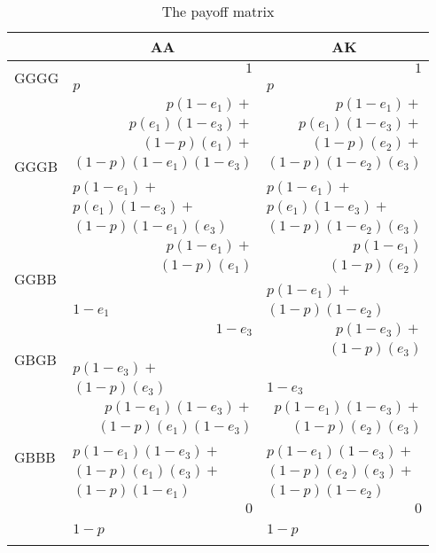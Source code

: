 \documentclass[a4paper,12pt]{article}
\numberwithin{equation}{section}
\renewcommand*{\arraystretch}{1.4}
\begin{document}
\begin{table}[h!]
\renewcommand\arraystretch{1.15}
\begin{center}
\begin{tabular}{l||l|l}
 &\multicolumn{1}{c|}{AA}&\multicolumn{1}{c}{AK}\\
\hline
\hline
\multirow{3}{*}{GGGG}&\multicolumn{1}{r|}{$1$}&\multicolumn{1}{r}{$1$}\\
 & \hspace{60mm} & \hspace{60mm} \\
 &$p$&$p$\\
\hline
\multirow{8}{*}{GGGB}&\multicolumn{1}{r|}{$p(1-e_{1})+$}&\multicolumn{1}{r}{$p(1-e_{1})+$}\\
 &\multicolumn{1}{r|}{$p(e_{1})(1-e_{3})+$}&\multicolumn{1}{r}{$p(e_{1})(1-e_{3})+$}\\
 &\multicolumn{1}{r|}{$(1-p)(e_{1})+$}&\multicolumn{1}{r}{$(1-p)(e_{2})+$}\\
 &\multicolumn{1}{r|}{$(1-p)(1-e_{1})(1-e_{3})$}&\multicolumn{1}{r}{$(1-p)(1-e_{2})(e_{3})$}\\
&&\\
 &$p(1-e_{1})+$&$p(1-e_{1})+$\\
 &$p(e_{1})(1-e_{3})+$&$p(e_{1})(1-e_{3})+$\\
 &$(1-p)(1-e_{1})(e_{3})$&$(1-p)(1-e_{2})(e_{3})$\\
\hline
\multirow{5}{*}{GGBB}&\multicolumn{1}{r|}{$p(1-e_{1})+$}&\multicolumn{1}{r}{$p(1-e_{1})$}\\
 &\multicolumn{1}{r|}{$(1-p)(e_{1})$}&\multicolumn{1}{r}{$(1-p)(e_{2})$}\\
&&\\
 &$ $&$p(1-e_{1})+$\\
 &$1-e_{1}$&$(1-p)(1-e_{2})$\\
\hline
\multirow{4}{*}{GBGB}&\multicolumn{1}{r|}{$1-e_{3}$}&\multicolumn{1}{r}{$p(1-e_{3})+$}\\
 &$ $&\multicolumn{1}{r}{$(1-p)(e_{3})$}\\
 &$p(1-e_{3})+$&$ $\\
 &$(1-p)(e_{3})$&$1-e_{3}$\\
\hline
\multirow{7}{*}{GBBB}&\multicolumn{1}{r|}{$p(1-e_{1})(1-e_{3})+$}&\multicolumn{1}{r}{$p(1-e_{1})(1-e_{3})+$}\\
 &\multicolumn{1}{r|}{$(1-p)(e_{1})(1-e_{3})$}&\multicolumn{1}{r}{$(1-p)(e_{2})(e_{3})$}\\
&&\\
 &$p(1-e_{1})(1-e_{3})+$&$p(1-e_{1})(1-e_{3})+$\\
 &$(1-p)(e_{1})(e_{3})+$&$(1-p)(e_{2})(e_{3})+$\\
 &$(1-p)(1-e_{1})$&$(1-p)(1-e_{2})$\\
\hline
\multirow{3}{*}{BBBB}&\multicolumn{1}{r|}{$0$}&\multicolumn{1}{r}{$0$}\\
&&\\
 &$1-p$&$1-p$\\
\multicolumn{3}{c}{ }
\end{tabular}
\end{center}
\caption{The payoff matrix}
\label{eq:Label}
\end{table}
\end{document}
